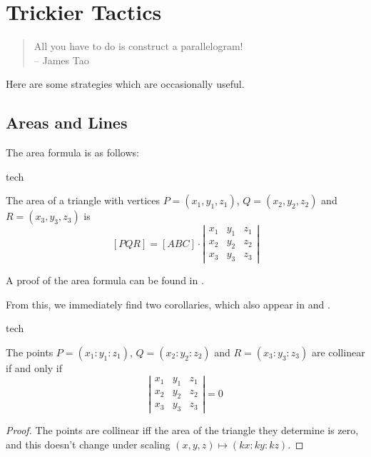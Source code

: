 \chapter{Trickier Tactics}
\begin{quote}
  All you have to do is construct a parallelogram!
  \\ -- James Tao
\end{quote}

Here are some strategies which are occasionally useful.
\section{Areas and Lines}
The area formula \cite{infinity,abel,yiu} is as follows:

\begin{StoreCode}{tech}
\begin{theorem}
  \label{tech:area}
  The area of a triangle with vertices $P=(x_1,y_1,z_1)$, $Q=(x_2,y_2,z_2)$ and $R=(x_3,y_3,z_3)$ is
  \[ [PQR] = [ABC] \cdot \left| \begin{array}{ccc} x_1 & y_1 & z_1 \\ x_2 & y_2 & z_2 \\ x_3 & y_3 & z_3 \end{array} \right| \]
\end{theorem}
\end{StoreCode}

A proof of the area formula can be found in \cite{abel}.

From this, we immediately find two corollaries, which also appear in \cite{infinity} and \cite{abel}.
\begin{StoreCode}{tech}
\begin{corollary}
  \label{tech:collnaive}
  The points $P=(x_1:y_1:z_1)$, $Q=(x_2:y_2:z_2)$ and $R=(x_3:y_3:z_3)$ are collinear if and only if
  \[ \left| \begin{array}{ccc} x_1 & y_1 & z_1 \\ x_2 & y_2 & z_2 \\ x_3 & y_3 & z_3 \end{array} \right| = 0 \]
\end{corollary}
\end{StoreCode}
\begin{proof}
  The points are collinear iff the area of the triangle they determine is zero, and this doesn't change under scaling $(x,y,z) \mapsto (kx:ky:kz)$.
\end{proof}

